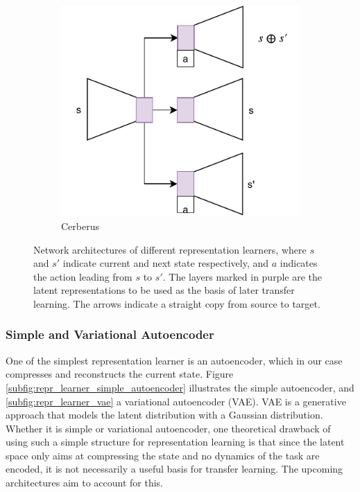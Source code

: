 \begin{figure}[ht!]
\begin{subfigure}{0.5\columnwidth}
		\includegraphics[width=\linewidth]{img/cerberus.pdf}
		\caption{Cerberus}
		\label{subfig:repr_learner_cerberus}
	\end{subfigure}
	\caption{Network architectures of different representation learners, where $s$ and $s'$ indicate current and next state respectively, and $a$ indicates the action leading from $s$ to $s'$. 
	The layers marked in purple are the latent representations to be used as the basis of later transfer learning. 
	The arrows indicate a straight copy from source to target.
	}
	\label{fig:repr_learner}
\end{figure}

\subsubsection{Simple and Variational Autoencoder}
One of the simplest representation learner is an autoencoder, which in our case compresses and reconstructs the current state. %
Figure \ref{subfig:repr_learner_simple_autoencoder} illustrates the simple autoencoder, and \ref{subfig:repr_learner_vae} a variational autoencoder (VAE). 
VAE is a generative approach that models the latent distribution with a Gaussian distribution.
Whether it is simple or variational autoencoder,
one theoretical drawback of using such a simple structure for representation learning is that since the latent space only aims at compressing the state and no dynamics of the task are encoded, it is not necessarily a useful basis for transfer learning.
The upcoming architectures aim to account for this.

